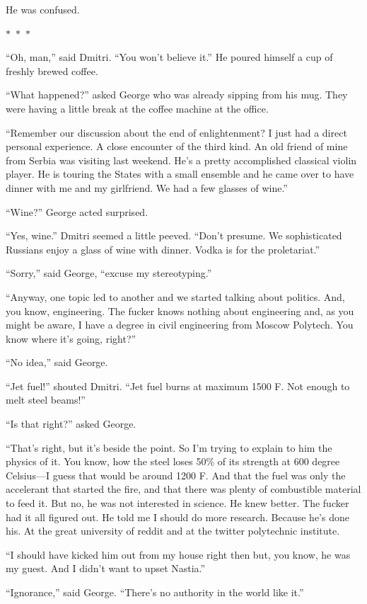 \documentclass{memoir}
\newcommand{\starbreak}{%
\begin{center}
  $\ast$~$\ast$~$\ast$
\end{center}
}
\begin{document}
He was confused. 

\starbreak

``Oh, man,'' said Dmitri. ``You won't believe it.'' He poured himself a cup of freshly brewed coffee.

``What happened?'' asked George who was already sipping from his mug. They were having a little break at the coffee machine at the office.

``Remember our discussion about the end of enlightenment? I just had a direct personal experience. A close encounter of the third kind. An old friend of mine from Serbia was visiting last weekend. He's a pretty accomplished classical violin player. He is touring the States with a small ensemble and he came over to have dinner with me and my girlfriend. We had a few glasses of wine.''

``Wine?'' George acted surprised.

``Yes, wine.'' Dmitri seemed a little peeved. ``Don't presume. We sophisticated Russians enjoy a glass of wine with dinner. Vodka is for the proletariat.''

``Sorry,'' said George, ``excuse my stereotyping.''

``Anyway, one topic led to another and we started talking about politics. And, you know, engineering. The fucker knows nothing about engineering and, as you might be aware, I have a degree in civil engineering from Moscow Polytech. You know where it's going, right?''

``No idea,'' said George.

``Jet fuel!'' shouted Dmitri. ``Jet fuel burns at maximum 1500 F. Not enough to melt steel beams!''

``Is that right?'' asked George.

``That's right, but it's beside the point. So I'm trying to explain to him the physics of it. You know, how the steel loses 50\% of its strength at 600 degree Celsius---I guess that would be around 1200 F. And that the fuel was only the accelerant that started the fire, and that there was plenty of combustible material to feed it. But no, he was not interested in science. He knew better. The fucker had it all figured out. He told me I should do more research. Because he's done his. At the great university of reddit and at the twitter polytechnic institute. 

``I should have kicked him out from my house right then but, you know, he was my guest. And I didn't want to upset Nastia.''

``Ignorance,'' said George. ``There's no authority in the world like it.''
\end{document}
